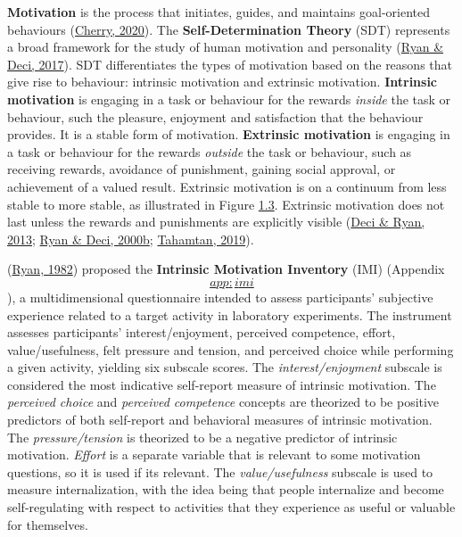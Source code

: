 \documentclass[a4paper, nobind]{templates/ociamthesis}
\begin{document}
\textbf{Motivation} is the process that initiates, guides, and maintains
goal-oriented behaviours (\protect\hyperlink{ref-cherry2020what}{Cherry, 2020}). The \textbf{Self-Determination
Theory} (SDT) represents a broad framework for the study of human
motivation and personality (\protect\hyperlink{ref-ryan2017self}{Ryan \& Deci, 2017}). SDT differentiates the types
of motivation based on the reasons that give rise to behaviour:
intrinsic motivation and extrinsic motivation. \textbf{Intrinsic motivation}
is engaging in a task or behaviour for the rewards \emph{inside} the task or
behaviour, such the pleasure, enjoyment and satisfaction that the
behaviour provides. It is a stable form of motivation. \textbf{Extrinsic
motivation} is engaging in a task or behaviour for the rewards
\emph{outside} the task or behaviour, such as receiving rewards, avoidance of
punishment, gaining social approval, or achievement of a valued result.
Extrinsic motivation is on a continuum from less stable to more stable,
as illustrated in Figure \protect\hyperlink{fig_sdt_components}{1.3}. Extrinsic motivation does not last
unless the rewards and punishments are explicitly visible
(\protect\hyperlink{ref-deci2013intrinsic}{Deci \& Ryan, 2013}; \protect\hyperlink{ref-ryan2000self}{Ryan \& Deci, 2000b}; \protect\hyperlink{ref-tahamtan2019effect}{Tahamtan, 2019}).

(\protect\hyperlink{ref-ryan1982control}{Ryan, 1982}) proposed the \textbf{Intrinsic Motivation Inventory} (IMI)
(Appendix \protect\hyperlink{app:imi}{\[app:imi\]}), a multidimensional questionnaire intended to
assess participants' subjective experience related to a target activity
in laboratory experiments. The instrument assesses participants'
interest/enjoyment, perceived competence, effort, value/usefulness, felt
pressure and tension, and perceived choice while performing a given
activity, yielding six subscale scores. The \emph{interest/enjoyment}
subscale is considered the most indicative self-report measure of
intrinsic motivation. The \emph{perceived choice} and \emph{perceived competence}
concepts are theorized to be positive predictors of both self-report and
behavioral measures of intrinsic motivation. The \emph{pressure/tension} is
theorized to be a negative predictor of intrinsic motivation. \emph{Effort}
is a separate variable that is relevant to some motivation questions, so
it is used if its relevant. The \emph{value/usefulness} subscale is used to
measure internalization, with the idea being that people internalize and
become self-regulating with respect to activities that they experience
as useful or valuable for themselves.
\end{document}
